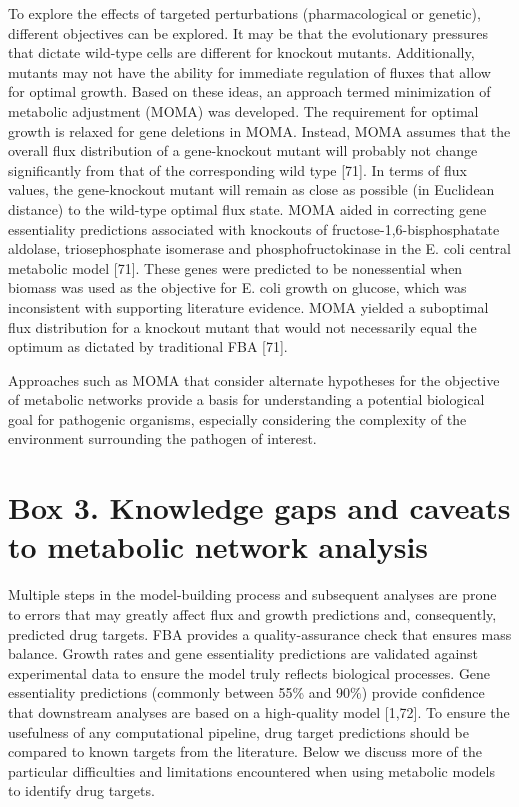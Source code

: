 To explore the effects of targeted perturbations 
(pharmacological or genetic), different objectives 
can be explored. It may be that the evolutionary 
pressures that dictate wild-type cells are different 
for knockout mutants. Additionally, mutants may 
not have the ability for immediate regulation of 
fluxes that allow for optimal growth. Based on these 
ideas, an approach termed minimization of metabolic 
adjustment (MOMA) was developed. The requirement for 
optimal growth is relaxed for gene deletions in MOMA. 
Instead, MOMA assumes that the overall flux distribution 
of a gene-knockout mutant will probably not change 
significantly from that of the corresponding wild type [71]. 
In terms of flux values, the gene-knockout mutant will 
remain as close as possible (in Euclidean distance) to 
the wild-type optimal flux state. MOMA aided in correcting 
gene essentiality predictions associated with knockouts 
of fructose-1,6-bisphosphatate aldolase, triosephosphate 
isomerase and phosphofructokinase in the E. coli 
central metabolic model [71]. These genes were predicted 
to be nonessential when biomass was used as the objective 
for E. coli growth on glucose, which was inconsistent with 
supporting literature evidence. MOMA yielded a suboptimal 
flux distribution for a knockout mutant that would not 
necessarily equal the optimum as dictated by traditional 
FBA [71].

Approaches such as MOMA that consider alternate hypotheses 
for the objective of metabolic networks provide a basis 
for understanding a potential biological goal for pathogenic 
organisms, especially considering the complexity of the 
environment surrounding the pathogen of interest.

\section{Box 3. Knowledge gaps and caveats to metabolic network analysis}
Multiple steps in the model-building process and subsequent 
analyses are prone to errors that may greatly affect flux 
and growth predictions and, consequently, predicted drug 
targets. FBA provides a quality-assurance check that ensures 
mass balance. Growth rates and gene essentiality predictions 
are validated against experimental data to ensure the 
model truly reflects biological processes. Gene essentiality 
predictions (commonly between 55\% and 90\%) provide 
confidence that downstream analyses are based on a 
high-quality model [1,72]. To ensure the usefulness of 
any computational pipeline, drug target predictions 
should be compared to known targets from the literature. 
Below we discuss more of the particular difficulties and 
limitations encountered when using metabolic models to 
identify drug targets.


